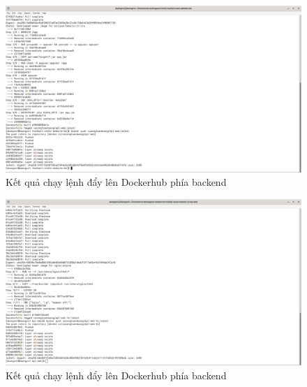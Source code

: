 \documentclass[../BTL.tex]{subfiles}
\begin{document}
\begin{figure}
    \centering
    \includegraphics[width=1\linewidth]{Hinhve/docker-push-be.png}
    \caption{Kết quả chạy lệnh đẩy lên Dockerhub phía backend}
    \label{fig:docker-push-be}
\end{figure}
\begin{figure}
    \centering
    \includegraphics[width=1\linewidth]{Hinhve/docker-push-fe.png}
    \caption{Kết quả chạy lệnh đẩy lên Dockerhub phía backend}
    \label{fig:docker-push-fe}
\end{figure}
\end{document}
